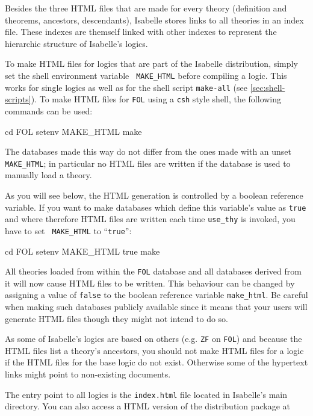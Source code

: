 Besides the three HTML files that are made for every theory
(definition and theorems, ancestors, descendants), Isabelle stores
links to all theories in an index file. These indexes are themself
linked with other indexes to represent the hierarchic structure of
Isabelle's logics.

To make HTML files for logics that are part of the Isabelle
distribution, simply set the shell environment variable {\tt
MAKE_HTML} before compiling a logic. This works for single logics as
well as for the shell script {\tt make-all} (see
\ref{sec:shell-scripts}). To make HTML files for {\tt FOL} using a
{\tt csh} style shell, the following commands can be used:

\begin{ttbox}
cd FOL
setenv MAKE_HTML
make
\end{ttbox}

The databases made this way do not differ from the ones made with an
unset {\tt MAKE_HTML}; in particular no HTML files are written if the
database is used to manually load a theory.

As you will see below, the HTML generation is controlled by a boolean
reference variable. If you want to make databases which define this
variable's value as {\tt true} and where therefore HTML files are
written each time {\tt use_thy} is invoked, you have to set {\tt
MAKE_HTML} to ``{\tt true}'':

\begin{ttbox}
cd FOL
setenv MAKE_HTML true
make
\end{ttbox}

All theories loaded from within the {\tt FOL} database and all
databases derived from it will now cause HTML files to be written.
This behaviour can be changed by assigning a value of {\tt false} to
the boolean reference variable {\tt make_html}. Be careful when making
such databases publicly available since it means that your users will
generate HTML files though they might not intend to do so.

As some of Isabelle's logics are based on others (e.g. {\tt ZF} on
{\tt FOL}) and because the HTML files list a theory's ancestors, you
should not make HTML files for a logic if the HTML files for the base
logic do not exist. Otherwise some of the hypertext links might point
to non-existing documents.

The entry point to all logics is the {\tt index.html} file located in
Isabelle's main directory. You can also access a HTML version of the
distribution package at

